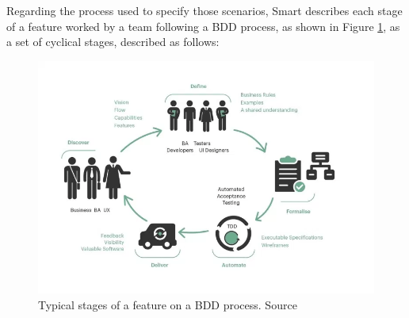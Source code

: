 Regarding the process used to specify those scenarios, Smart \cite{Ferguson_2017} describes each stage of a feature worked by a team following a BDD process, as shown in Figure \ref{fig:bdd_process}, as a set of cyclical stages, described as follows: 

\begin{figure}
\centering
\includegraphics[scale=0.6]{images/bdd}
\caption{Typical stages of a feature on a BDD process. Source \cite{Ferguson_2017}}
\label{fig:bdd_process}
\end{figure}

